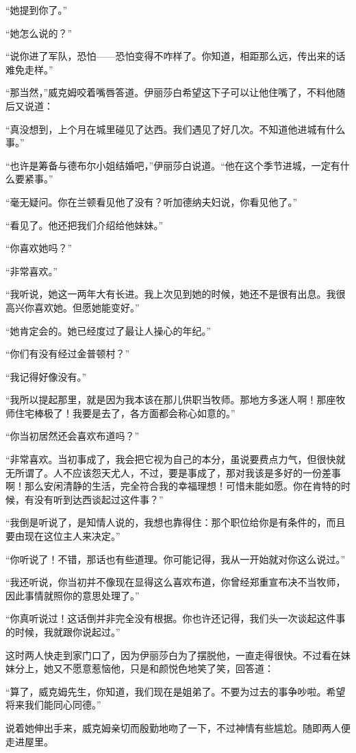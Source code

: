 \par “她提到你了。”
\par “她怎么说的？”
\par “说你进了军队，恐怕——恐怕变得不咋样了。你知道，相距那么远，传出来的话难免走样。”
\par “那当然，”威克姆咬着嘴唇答道。伊丽莎白希望这下子可以让他住嘴了，不料他随后又说道：
\par “真没想到，上个月在城里碰见了达西。我们遇见了好几次。不知道他进城有什么事。”
\par “也许是筹备与德布尔小姐结婚吧，”伊丽莎白说道。“他在这个季节进城，一定有什么要紧事。”
\par “毫无疑问。你在兰顿看见他了没有？听加德纳夫妇说，你看见他了。”
\par “看见了。他还把我们介绍给他妹妹。”
\par “你喜欢她吗？”
\par “非常喜欢。”
\par “我听说，她这一两年大有长进。我上次见到她的时候，她还不是很有出息。我很高兴你喜欢她。但愿她能变好。”
\par “她肯定会的。她已经度过了最让人操心的年纪。”
\par “你们有没有经过金普顿村？”
\par “我记得好像没有。”
\par “我所以提起那里，就是因为我本该在那儿供职当牧师。那地方多迷人啊！那座牧师住宅棒极了！我要是去了，各方面都会称心如意的。”
\par “你当初居然还会喜欢布道吗？”
\par “非常喜欢。当初事成了，我会把它视为自己的本分，虽说要费点力气，但很快就无所谓了。人不应该怨天尤人，不过，要是事成了，那对我该是多好的一份差事啊！那么安闲清静的生活，完全符合我的幸福理想！可惜未能如愿。你在肯特的时候，有没有听到达西谈起过这件事？”
\par “我倒是听说了，是知情人说的，我想也靠得住：那个职位给你是有条件的，而且要由现在这位主人来决定。”
\par “你听说了！不错，那话也有些道理。你可能记得，我从一开始就对你这么说过。”
\par “我还听说，你当初并不像现在显得这么喜欢布道，你曾经郑重宣布决不当牧师，因此事情就照你的意思处理了。”
\par “你真听说过！这话倒并非完全没有根据。你也许还记得，我们头一次谈起这件事的时候，我就跟你说起过。”
\par 这时两人快走到家门口了，因为伊丽莎白为了摆脱他，一直走得很快。不过看在妹妹分上，她又不愿意惹恼他，只是和颜悦色地笑了笑，回答道：
\par “算了，威克姆先生，你知道，我们现在是姐弟了。不要为过去的事争吵啦。希望将来我们能同心同德。”
\par 说着她伸出手来，威克姆亲切而殷勤地吻了一下，不过神情有些尴尬。随即两人便走进屋里。



